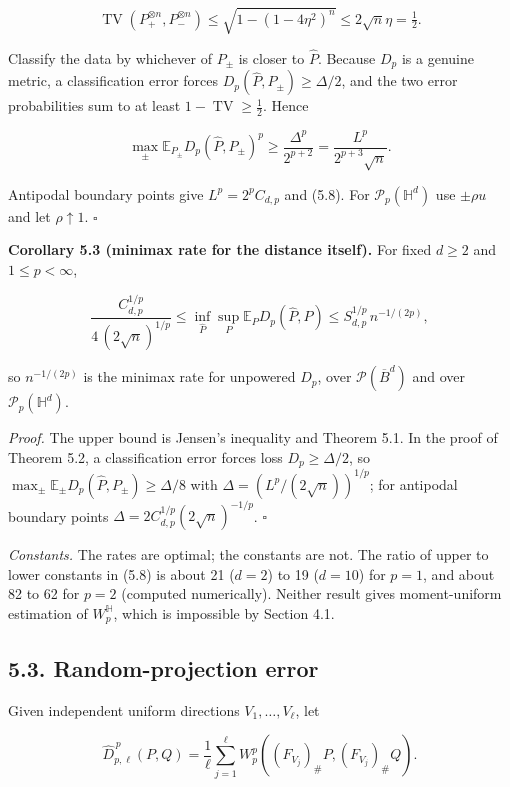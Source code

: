 \documentclass[
  british,
  11pt,
  a4paper,
]{article}
\begin{document}
\[
\operatorname{TV}(P_+^{\otimes n},P_-^{\otimes n})
\leq\sqrt{1-(1-4\eta^2)^n}\leq2\sqrt n\eta=\tfrac12 .
\]

Classify the data by whichever of \(P_\pm\) is closer to \(\widehat P\).
Because \(D_p\) is a genuine metric, a classification error forces
\(D_p(\widehat P,P_\pm)\geq\Delta/2\), and the two error probabilities
sum to at least \(1-\operatorname{TV}\geq\tfrac12\). Hence

\[
\max_{\pm}\mathbb E_{P_\pm}D_p(\widehat P,P_\pm)^p
\geq\frac{\Delta^p}{2^{p+2}}=\frac{L^p}{2^{p+3}\sqrt n}.
\tag{5.9}
\]

Antipodal boundary points give \(L^p=2^pC_{d,p}\) and (5.8). For
\(\mathcal P_p(\mathbb H^d)\) use \(\pm\rho u\) and let
\(\rho\uparrow1\). \(\square\)

\textbf{Corollary 5.3 (minimax rate for the distance itself).} For fixed
\(d\geq2\) and \(1\leq p<\infty\),

\[
\frac{C_{d,p}^{1/p}}{4\,(2\sqrt n)^{1/p}}\leq
\inf_{\widehat P}\sup_{P}\mathbb E_P D_p(\widehat P,P)
\leq S_{d,p}^{1/p}\,n^{-1/(2p)},
\tag{5.10}
\]

so \(n^{-1/(2p)}\) is the minimax rate for unpowered \(D_p\), over
\(\mathcal P(\overline B^d)\) and over \(\mathcal P_p(\mathbb H^d)\).

\emph{Proof.} The upper bound is Jensen's inequality and Theorem 5.1. In
the proof of Theorem 5.2, a classification error forces loss
\(D_p\geq\Delta/2\), so
\(\max_\pm\mathbb E_\pm D_p(\widehat P,P_\pm)\geq\Delta/8\) with
\(\Delta=(L^p/(2\sqrt n))^{1/p}\); for antipodal boundary points
\(\Delta=2C_{d,p}^{1/p}(2\sqrt n)^{-1/p}\). \(\square\)

\emph{Constants.} The rates are optimal; the constants are not. The
ratio of upper to lower constants in (5.8) is about 21 (\(d=2\)) to 19
(\(d=10\)) for \(p=1\), and about 82 to 62 for \(p=2\) (computed
numerically). Neither result gives moment-uniform estimation of
\(W_p^{\mathbb H}\), which is impossible by Section 4.1.

\subsection{5.3. Random-projection error}\label{random-projection-error}

Given independent uniform directions \(V_1,\ldots,V_\ell\), let

\[
\widehat D_{p,\ell}^{\,p}(P,Q)=\frac1\ell\sum_{j=1}^\ell
W_p^p((F_{V_j})_\#P,(F_{V_j})_\#Q).
\]
\end{document}
